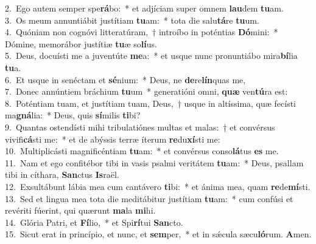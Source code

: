 {2.~}Ego autem semper spe\textbf{rá}bo:~* et adjíciam super omnem \textbf{lau}dem \textbf{tu}am.\\
{3.~}Os meum annuntiábit justítiam \textbf{tu}am:~* tota die salu\textbf{tá}re \textbf{tu}um.\\
{4.~}Quóniam non cognóvi litteratúram,~† introíbo in poténtias \textbf{Dó}mini:~* Dómine, memorábor justítiæ \textbf{tu}æ so\textbf{lí}us.\\
{5.~}Deus, docuísti me a juventúte \textbf{me}a:~* et usque nunc pronuntiábo mira\textbf{bí}lia \textbf{tu}a.\\
{6.~}Et usque in senéctam et \textbf{sé}nium:~* Deus, ne \textbf{de}re\textbf{lín}quas me,\\
{7.~}Donec annúntiem bráchium \textbf{tu}um~* generatióni omni, \textbf{quæ} ven\textbf{tú}ra est:\\
{8.~}Poténtiam tuam, et justítiam tuam, Deus,~† usque in altíssima, quæ fecísti ma\textbf{gná}lia:~* Deus, quis \textbf{sí}milis \textbf{ti}bi?\\
{9.~}Quantas ostendísti mihi tribulatiónes multas et malas:~† et convérsus vivifi\textbf{cá}sti me:~* et de abýssis terræ íterum \textbf{re}du\textbf{xí}sti me:\\
{10.~}Multiplicásti magnificéntiam \textbf{tu}am:~* et convérsus conso\textbf{lá}tus \textbf{es} me.\\
{11.~}Nam et ego confitébor tibi in vasis psalmi veritátem \textbf{tu}am:~* Deus, psallam tibi in cíthara, \textbf{San}ctus \textbf{Is}raël.\\
{12.~}Exsultábunt lábia mea cum cantávero \textbf{ti}bi:~* et ánima mea, quam \textbf{re}de\textbf{mí}sti.\\
{13.~}Sed et lingua mea tota die meditábitur justítiam \textbf{tu}am:~* cum confúsi et revériti fúerint, qui quærunt \textbf{ma}la \textbf{mi}hi.\\
{14.~}Glória Patri, et \textbf{Fí}lio,~* et Spi\textbf{rí}tui \textbf{San}cto.\\
{15.~}Sicut erat in princípio, et nunc, et \textbf{sem}per,~* et in sǽcula sæcu\textbf{ló}rum. \textbf{A}men.\\
